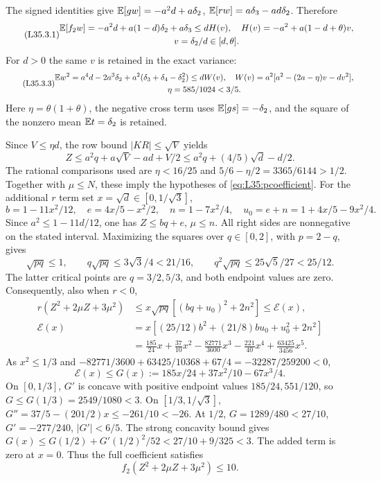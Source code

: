 The signed identities give
$\mathbb E[gw]=-a^2d+a\delta_2$, $\mathbb E[rw]=a\delta_3-ad\delta_2$.
Therefore
\begin{equation}\tag{L35.3.1}\label{eq:L35:covariance}
\begin{gathered}
\mathbb E[f_2w]=-a^2d+a(1-d)\delta_2+a\delta_3
\le dH(v),\quad H(v)=-a^2+a(1-d+\theta)v,\\
v=\delta_2/d\in[d,\theta].
\end{gathered}
\end{equation}
For $d>0$ the same $v$ is retained in the exact variance:
\begin{equation}\tag{L35.3.3}\label{eq:L35:variance}
\begin{gathered}
\mathbb E w^2=a^4d-2a^3\delta_2+a^2(\delta_3+\delta_4-\delta_2^2)
\le dW(v),\quad W(v)=a^2[a^2-(2a-\eta)v-dv^2],\\
\eta=585/1024<3/5.
\end{gathered}
\end{equation}
Here $\eta=\theta(1+\theta)$, the negative cross term uses
$\mathbb E[gs]=-\delta_2$, and the square of the nonzero mean
$\mathbb E t=\delta_2$ is retained.

Since $V\le\eta d$, the row bound $|KR|\le\sqrt V$ yields
\[
Z\le a^2q+a\sqrt V-ad+V/2
\le a^2q+(4/5)\sqrt d-d/2.
\]
The rational comparisons used are $\eta<16/25$ and
$5/6-\eta/2=3365/6144>1/2$. Together with $\mu\le N$, these imply
the hypotheses of \eqref{eq:L35:pcoefficient}.
For the additional $r$ term set $x=\sqrt d\in[0,1/\sqrt3]$,
\[
b=1-11x^2/12,\quad e=4x/5-x^2/2,\quad
n=1-7x^2/4,\quad u_0=e+n=1+4x/5-9x^2/4.
\]
Since $a^2\le1-11d/12$, one has $Z\le bq+e$, $\mu\le n$.
All right sides are nonnegative on the stated interval. Maximizing the
squares over $q\in[0,2]$, with $p=2-q$, gives
\[
\sqrt{pq}\le1,\qquad q\sqrt{pq}\le3\sqrt3/4<21/16,
\qquad q^2\sqrt{pq}\le25\sqrt5/27<25/12.
\]
The latter critical points are $q=3/2,5/3$, and both endpoint values
are zero. Consequently, also when $r<0$,
\begin{align*}
r(Z^2+2\mu Z+3\mu^2)
&\le x\sqrt{pq}[(bq+u_0)^2+2n^2]\le\mathcal E(x),\\
\mathcal E(x)&=x[(25/12)b^2+(21/8)bu_0+u_0^2+2n^2]\\
&=\frac{185}{24}x+\frac{37}{10}x^2-\frac{82771}{3600}x^3
-\frac{221}{40}x^4+\frac{63425}{3456}x^5.
\end{align*}
As $x^2\le1/3$ and
$-82771/3600+63425/10368+67/4=-32287/259200<0$,
\[
\mathcal E(x)\le G(x):=185x/24+37x^2/10-67x^3/4.
\]
On $[0,1/3]$, $G'$ is concave with positive endpoint values
$185/24,551/120$, so $G\le G(1/3)=2549/1080<3$.
On $[1/3,1/\sqrt3]$,
$G''=37/5-(201/2)x\le-261/10<-26$.
At $1/2$, $G=1289/480<27/10$, $G'=-277/240$, $|G'|<6/5$.
The strong concavity bound gives
$G(x)\le G(1/2)+G'(1/2)^2/52<27/10+9/325<3$.
The added term is zero at $x=0$. Thus the full coefficient satisfies
\begin{equation}\tag{L35.4.6}\label{eq:L35:coefficient}
f_2(Z^2+2\mu Z+3\mu^2)\le10.
\end{equation}

